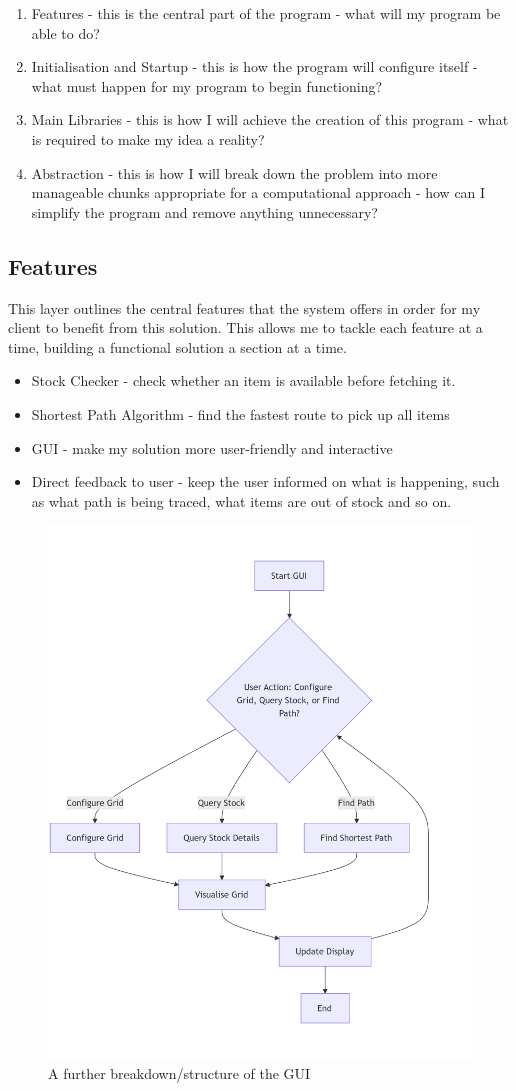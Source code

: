 \begin{enumerate}
    \item Features - this is the central part of the program - what will my program be able to do?
    \item Initialisation and Startup - this is how the program will configure itself - what must happen for my program to begin functioning?
    \item Main Libraries - this is how I will achieve the creation of this program - what is required to make my idea a reality?
    \item Abstraction - this is how I will break down the problem into more manageable chunks appropriate for a computational approach - how can I simplify the program and remove anything unnecessary?
\end{enumerate}


\subsection{Features}
This layer outlines the central features that the system offers in order for my client to benefit from this solution. This allows me to tackle each feature at a time, building a functional solution a section at a time.


\begin{itemize}
    \item Stock Checker - check whether an item is available before fetching it.
    \item Shortest Path Algorithm - find the fastest route to pick up all items
    \item GUI - make my solution more user-friendly and interactive
    \item Direct feedback to user - keep the user informed on what is happening, such as what path is being traced, what items are out of stock and so on.
\end{itemize}

\begin{figure}[!htbp]
	\centering
	\includegraphics[width=0.38\linewidth]{Images/guioutline.png}
	\caption{A further breakdown/structure of the GUI}
\end{figure}



